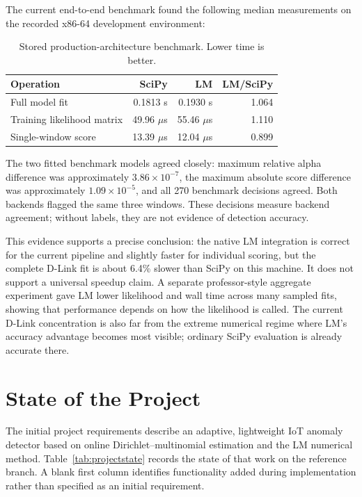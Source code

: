 \documentclass[11pt,a4paper]{article}
\begin{document}
The current end-to-end benchmark found the following median measurements on the recorded x86-64 development environment:

\begin{table}[ht]
\centering
\small
\begin{tabular}{lrrr}
\toprule
\textbf{Operation} & \textbf{SciPy} & \textbf{LM} & \textbf{LM/SciPy} \\
\midrule
Full model fit & 0.1813 s & 0.1930 s & 1.064 \\
Training likelihood matrix & 49.96 $\mu$s & 55.46 $\mu$s & 1.110 \\
Single-window score & 13.39 $\mu$s & 12.04 $\mu$s & 0.899 \\
\bottomrule
\end{tabular}
\caption{Stored production-architecture benchmark. Lower time is better.}
\label{tab:benchmark}
\end{table}

The two fitted benchmark models agreed closely: maximum relative alpha difference was approximately $3.86\times10^{-7}$, the maximum absolute score difference was approximately $1.09\times10^{-5}$, and all 270 benchmark decisions agreed. Both backends flagged the same three windows. These decisions measure backend agreement; without labels, they are not evidence of detection accuracy.

This evidence supports a precise conclusion: the native LM integration is correct for the current pipeline and slightly faster for individual scoring, but the complete D-Link fit is about 6.4\% slower than SciPy on this machine. It does not support a universal speedup claim. A separate professor-style aggregate experiment gave LM lower likelihood and wall time across many sampled fits, showing that performance depends on how the likelihood is called. The current D-Link concentration is also far from the extreme numerical regime where LM's accuracy advantage becomes most visible; ordinary SciPy evaluation is already accurate there.

\section{State of the Project}

The initial project requirements describe an adaptive, lightweight IoT anomaly detector based on online Dirichlet--multinomial estimation and the LM numerical method. Table~\ref{tab:projectstate} records the state of that work on the reference branch. A blank first column identifies functionality added during implementation rather than specified as an initial requirement.
\end{document}

